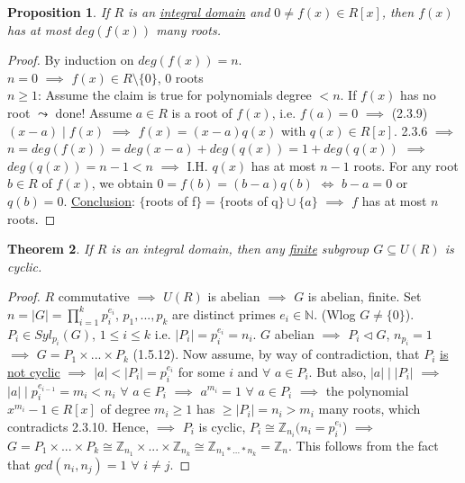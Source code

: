 \documentclass[11pt]{article}
\newtheorem{thm}{Theorem}[section]
\newtheorem{prop}[thm]{Proposition}
\theoremstyle{definition}
\numberwithin{equation}{section}
\newcommand{\Z}{\mathbb{Z}}
\newcommand{\N}{\mathbb{N}} %
\begin{document}
\begin{prop}
If $R$ is an \underline{integral domain} and $0 \neq f(x) \in R[x]$, then $f(x)$ has at most $deg(f(x))$ many roots.
\end{prop}

\begin{proof}
By induction on $deg(f(x)) = n$.\\
$n = 0$ $\implies$ $f(x) \in R \setminus \{0\}$, $0$ roots\\
$n \geq 1$: Assume the claim is true for polynomials degree $< n$. If $f(x)$ has no root $\leadsto$ done! Assume $a \in R$ is a root of $f(x)$, i.e. $f(a) = 0$ $\implies$ (2.3.9) $(x-a) \mid f(x)$ $\implies$ $f(x) = (x-a)q(x)$ with $q(x) \in R[x]$. 2.3.6 $\implies$ $n = deg(f(x)) = deg(x-a) + deg(q(x)) = 1 + deg(q(x))$ $\implies$ $deg(q(x)) = n-1 < n$ $\implies$ I.H. $q(x)$ has at most $n-1$ roots. For any root $b \in R$ of $f(x)$, we obtain $0 = f(b) = (b-a)q(b)$ $\Leftrightarrow$ $b-a = 0$ or $q(b) = 0$. \underline{Conclusion}: $\{$roots of f$\} = \{$roots of q$\} \cup \{a\}$ $\implies$ $f$ has at most $n$ roots.
\end{proof}

\begin{thm}
If $R$ is an integral domain, then any  \underline{finite} subgroup $G \subseteq U(R)$ is cyclic.
\end{thm}

\begin{proof}
$R$ commutative $\implies$ $U(R)$ is abelian $\implies$ $G$ is abelian, finite. Set $n = |G| = \prod_{i = 1}^{k} p_{i}^{e_{i}}$, $p_{1},...,p_{k}$ are distinct primes $e_{i} \in \N$. (Wlog $G \neq \{0\}$). $P_{i} \in Syl_{p_{i}}(G)$, $1 \leq i \leq k$ i.e. $|P_{i}| = p_{i}^{e_{i}} = n_{i}$. $G$ abelian $\implies$ $P_{i} \vartriangleleft G$, $n_{p_{i}} = 1$ $\implies$ $G = P_{1} \times ... \times P_{k}$ (1.5.12). Now assume, by way of contradiction, that $P_{i}$ \underline{is not cyclic} $\implies$ $|a| < |P_{i}| = p_{i}^{e_{i}}$ for some $i$ and $\forall$ $a \in P_{i}$. But also, $|a| \mid |P_{i}|$ $\implies$ $|a| \mid p_{i}^{e_{i-1}} = m_{i} < n_{i}$ $\forall$ $a \in P_{i}$ $\implies$ $a^{m_{i}} = 1$ $\forall$ $a \in P_{i}$ $\implies$ the polynomial $x^{m_{i}} - 1 \in R[x]$ of degree $m_{i} \geq 1$ has $\geq |P_{i}| = n_{i} > m_{i}$ many roots, which contradicts 2.3.10. Hence, $\implies$ $P_{i}$ is cyclic, $P_{i} \cong \Z_{n_{i}} (n_{i} = p_{i}^{e_{i}}$) $\implies$ $G = P_{1} \times ... \times P_{k} \cong \Z_{n_{1}} \times ... \times \Z_{n_{k}} \cong \Z_{n_{1}*...*n_{k}} = \Z_{n}$. This follows from the fact that $gcd(n_{i}, n_{j}) = 1$ $\forall$ $i \neq j$.
\end{proof}
\end{document}
